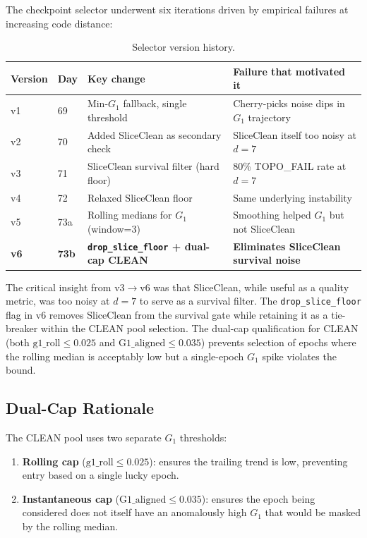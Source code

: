 The checkpoint selector underwent six iterations driven by empirical failures at increasing code distance:

\begin{table}
\caption{Selector version history.}
\label{tab:selector_evolution}
\renewcommand{\arraystretch}{1.2}
\begin{ruledtabular}
\begin{tabular}{llll}
Version & Day & Key change & Failure that motivated it \\
\hline
v1 & 69 & Min-$G_1$ fallback, single threshold & Cherry-picks noise dips in $G_1$ trajectory \\
v2 & 70 & Added SliceClean as secondary check & SliceClean itself too noisy at $d{=}7$ \\
v3 & 71 & SliceClean survival filter (hard floor) & 80\% TOPO\_FAIL rate at $d{=}7$ \\
v4 & 72 & Relaxed SliceClean floor & Same underlying instability \\
v5 & 73a & Rolling medians for $G_1$ (window=3) & Smoothing helped $G_1$ but not SliceClean \\
\textbf{v6} & \textbf{73b} & \textbf{\texttt{drop\_slice\_floor} + dual-cap CLEAN} & \textbf{Eliminates SliceClean survival noise} \\
\end{tabular}
\end{ruledtabular}
\renewcommand{\arraystretch}{1.0}
\end{table}

The critical insight from v3$\to$v6 was that SliceClean, while useful as a quality metric, was too noisy at $d{=}7$ to serve as a survival filter. The \texttt{drop\_slice\_floor} flag in v6 removes SliceClean from the survival gate while retaining it as a tie-breaker within the CLEAN pool selection. The dual-cap qualification for CLEAN (both $\mathrm{g1\_roll} \leq 0.025$ and $\mathrm{G1\_aligned} \leq 0.035$) prevents selection of epochs where the rolling median is acceptably low but a single-epoch $G_1$ spike violates the bound.

\subsection{Dual-Cap Rationale}

The CLEAN pool uses two separate $G_1$ thresholds:

\begin{enumerate}
\item \textbf{Rolling cap} ($\mathrm{g1\_roll} \leq 0.025$): ensures the trailing trend is low, preventing entry based on a single lucky epoch.
\item \textbf{Instantaneous cap} ($\mathrm{G1\_aligned} \leq 0.035$): ensures the epoch being considered does not itself have an anomalously high $G_1$ that would be masked by the rolling median.
\end{enumerate}

